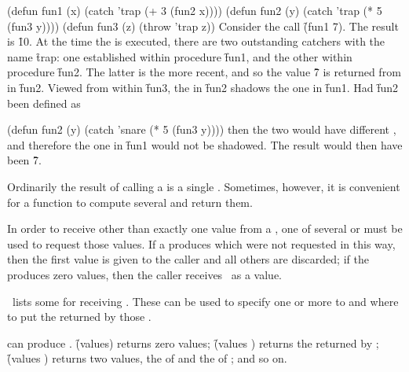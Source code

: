 \code
 (defun fun1 (x)
   (catch 'trap (+ 3 (fun2 x))))
 (defun fun2 (y)
   (catch 'trap (* 5 (fun3 y))))
 (defun fun3 (z)
   (throw 'trap z))
\endcode
Consider the call \f{(fun1 7)}.  The result is \f{10}.  At the time
the  is executed, there are two outstanding catchers with the
name \f{trap}: one established within procedure \f{fun1}, and the other
within procedure \f{fun2}.  The latter is the more recent, and so the
value \f{7} is returned from  in \f{fun2}.
Viewed from within \f{fun3}, the  
in \f{fun2} shadows the one in \f{fun1}.
Had \f{fun2} been defined as

\code
 (defun fun2 (y)
   (catch 'snare (* 5 (fun3 y))))
\endcode
then the two  
would have different , and therefore the one
in \f{fun1} would not be shadowed.  The result would then have been \f{7}.

\endSubsection%


Ordinarily the result of calling a  is a single .
Sometimes, however, it is convenient for a function to compute several
 and return them.

In order to receive other than exactly one value from a ,
one of several  or  must be used to request those
values.  If a  produces  which were not
requested in this way, then the first value is given to the caller and
all others are discarded; if the  produces zero values,
then the caller receives \nil\ as a value.

\Thenextfigure\ lists 
some  for receiving .
These  can be used to specify 
    one or more  to  
and where to put the  returned by those .


 can produce .
\f{(values)} returns zero values;
\f{(values )} returns the  returned by ;
\f{(values  )} returns two values,
    the  of 
and the  of ;
and so on.

